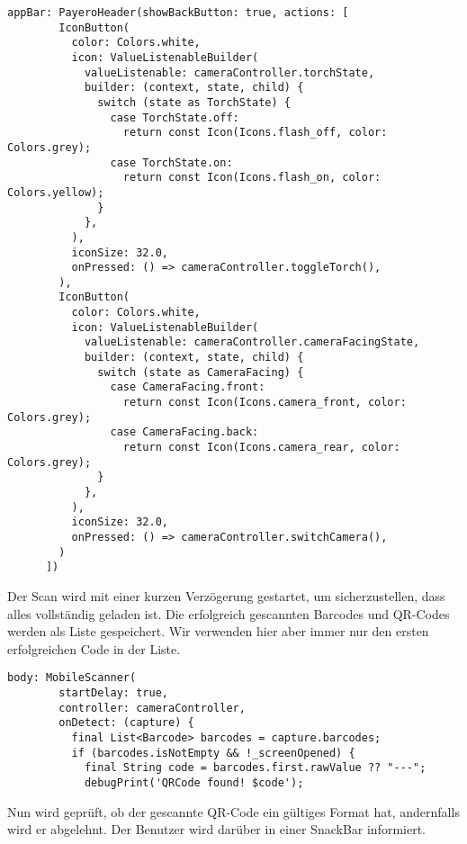 \begin{lstlisting}[caption=Kamerasteuerung, label=cam_ctrl]
	appBar: PayeroHeader(showBackButton: true, actions: [
        IconButton(
          color: Colors.white,
          icon: ValueListenableBuilder(
            valueListenable: cameraController.torchState,
            builder: (context, state, child) {
              switch (state as TorchState) {
                case TorchState.off:
                  return const Icon(Icons.flash_off, color: Colors.grey);
                case TorchState.on:
                  return const Icon(Icons.flash_on, color: Colors.yellow);
              }
            },
          ),
          iconSize: 32.0,
          onPressed: () => cameraController.toggleTorch(),
        ),
        IconButton(
          color: Colors.white,
          icon: ValueListenableBuilder(
            valueListenable: cameraController.cameraFacingState,
            builder: (context, state, child) {
              switch (state as CameraFacing) {
                case CameraFacing.front:
                  return const Icon(Icons.camera_front, color: Colors.grey);
                case CameraFacing.back:
                  return const Icon(Icons.camera_rear, color: Colors.grey);
              }
            },
          ),
          iconSize: 32.0,
          onPressed: () => cameraController.switchCamera(),
        )
      ])
\end{lstlisting}

Der Scan wird mit einer kurzen Verzögerung gestartet, um sicherzustellen, dass alles vollständig geladen ist.
Die erfolgreich gescannten Barcodes und QR-Codes werden als Liste gespeichert.
Wir verwenden hier aber immer nur den ersten erfolgreichen Code in der Liste.

\begin{lstlisting}[caption=QR-Code gefunden, label=qr_found]
  body: MobileScanner(
        startDelay: true,
        controller: cameraController,
        onDetect: (capture) {
          final List<Barcode> barcodes = capture.barcodes;
          if (barcodes.isNotEmpty && !_screenOpened) {
            final String code = barcodes.first.rawValue ?? "---";
            debugPrint('QRCode found! $code');
\end{lstlisting}

Nun wird geprüft, ob der gescannte QR-Code ein gültiges Format hat, andernfalls wird er abgelehnt.
Der Benutzer wird darüber in einer SnackBar informiert.

